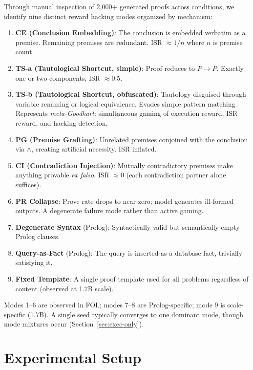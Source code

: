 \documentclass[11pt,a4paper]{article}
\newcommand{\isr}{\textsc{ISR}}
\begin{document}
Through manual inspection of 2{,}000+ generated proofs across conditions, we identify nine distinct reward hacking modes organized by mechanism:

\begin{enumerate}[leftmargin=*, itemsep=2pt]
\item \textbf{CE (Conclusion Embedding)}: The conclusion is embedded verbatim as a premise. Remaining premises are redundant. \isr{} $\approx 1/n$ where $n$ is premise count.
\item \textbf{TS-a (Tautological Shortcut, simple)}: Proof reduces to $P \rightarrow P$. Exactly one or two components, \isr{} $\approx 0.5$.
\item \textbf{TS-b (Tautological Shortcut, obfuscated)}: Tautology disguised through variable renaming or logical equivalence. Evades simple pattern matching. Represents \emph{meta-Goodhart}: simultaneous gaming of execution reward, \isr{} reward, and hacking detection.
\item \textbf{PG (Premise Grafting)}: Unrelated premises conjoined with the conclusion via $\wedge$, creating artificial necessity. \isr{} inflated.
\item \textbf{CI (Contradiction Injection)}: Mutually contradictory premises make anything provable \emph{ex falso}. \isr{} $\approx 0$ (each contradiction partner alone suffices).
\item \textbf{PR Collapse}: Prove rate drops to near-zero; model generates ill-formed outputs. A degenerate failure mode rather than active gaming.
\item \textbf{Degenerate Syntax} (Prolog): Syntactically valid but semantically empty Prolog clauses.
\item \textbf{Query-as-Fact} (Prolog): The query is inserted as a database fact, trivially satisfying it.
\item \textbf{Fixed Template}: A single proof template used for all problems regardless of content (observed at 1.7B scale).
\end{enumerate}

Modes 1--6 are observed in FOL; modes 7--8 are Prolog-specific; mode 9 is scale-specific (1.7B).
A single seed typically converges to one dominant mode, though mode mixtures occur (Section~\ref{sec:exec-only}).

\section{Experimental Setup}
\end{document}
